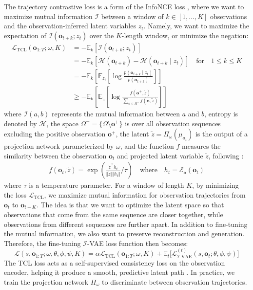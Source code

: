 The trajectory contrastive loss is a form of the InfoNCE loss \cite{oord2018representation}, where we want to maximize mutual information $\mathcal{I}$ between a window of $k \in [1,\ldots,K]$ observations and the observation-inferred latent variables $z_t$. Namely, we want to maximize the expectation of $\mathcal{I}(\mathbf{o}_{t+k}; z_t)$ over the $K$-length window, or minimize the negation:
\begin{align}
    \mathcal{L}_\text{TCL}(\mathbf{o}_{1:T}; \omega, K) &= -\mathbb{E}_k[\mathcal{I}(\mathbf{o}_{t+k}; z_t)] \label{eq:tcl} \\
        &= -\mathbb{E}_k[\mathcal{H}(\mathbf{o}_{t+k}) - \mathcal{H}(\mathbf{o}_{t+k} \mid z_t)] \quad \text{for} \quad 1 \le k \le K \\
        &= -\mathbb{E}_k \left[ \mathbb{E}_{z_t} \left[ \log \frac{p(\mathbf{o}_{t+k} \mid z_t)}{p(\mathbf{o}_{t+k})} \right] \right] \\
        &\ge -\mathbb{E}_k \left[ \mathbb{E}_{\tilde{z}} \left[ \log \frac{f(\mathbf{o}^+, \tilde{z})}{\sum_{\mathbf{o} \in \Omega^-} f(\mathbf{o}, \tilde{z})} \right] \right]
\end{align}
where $\mathcal{I}(a,b)$ represents the mutual information between $a$ and $b$, entropy is denoted by $\mathcal{H}$, the space $\Omega^- = \{\Omega \setminus \mathbf{o}^+\}$ is over all observation sequences excluding the positive observation $\mathbf{o}^+$, the latent $\tilde{z} = \Pi_\omega(\mu_{\mathbf{o}_t})$ is the output of a projection network parameterized by $\omega$, and the function $f$ measures the similarity between the observation $\mathbf{o}_t$ and projected latent variable $\tilde{z}$, following \textcite{oord2018representation}:
\begin{align}
    f(\mathbf{o}_t, \tilde{z}) = \exp \left(\frac{\tilde{z}^\top h_t}{\Vert \tilde{z} \Vert \Vert h_t \Vert} / \tau \right) \quad \text{where} \quad h_t = \mathcal{E}_\mathbf{o}(\mathbf{o}_t)
\end{align}
where $\tau$ is a temperature parameter.
For a window of length $K$, by minimizing the loss $\mathcal{L}_\text{TCL}$, we maximize mutual information for observation trajectories from $\mathbf{o}_{t}$ to $\mathbf{o}_{t+K}$.
The idea is that we want to optimize the latent space so that observations that come from the same sequence are closer together, while observations from different sequences are further apart.
In addition to fine-tuning the mutual information, we also want to preserve reconstruction and generation.
Therefore, the fine-tuning $\mathcal{I}$-VAE loss function then becomes:
\begin{equation}
    \mathcal{L}(s, \mathbf{o}_{1:T}; \omega, \theta, \phi, \psi, K) = \alpha \mathcal{L}_\text{TCL}(\mathbf{o}_{1:T}; \omega, K) + \mathbb{E}_{t} \Big[\mathcal{L}_{\mathcal{I}\text{-VAE}}^{(t)}(s, \mathbf{o}_t; \theta, \phi, \psi)\Big]
\end{equation}
The TCL loss acts as a self-supervised consistency loss on the observation encoder, helping it produce a smooth, predictive latent path \cite{zheng2023taco}.
In practice, we train the projection network $\Pi_\omega$ to discriminate between observation trajectories.

